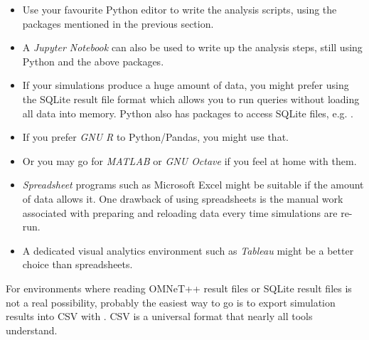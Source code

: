 \begin{itemize}
  \item Use your favourite Python editor to write the analysis scripts, using
    the packages mentioned in the previous section.
  \item A \textit{Jupyter Notebook} can also be used to write up the analysis
    steps, still using Python and the above packages.
  \item If your simulations produce a huge amount of data, you might prefer using
    the SQLite result file format which allows you to run queries without
    loading all data into memory. Python also has packages to access SQLite files,
    e.g. .
  \item If you prefer \textit{GNU R} to Python/Pandas, you might use that.
  \item Or you may go for \textit{MATLAB} or \textit{GNU Octave} if you feel at home with them.
  \item \textit{Spreadsheet} programs such as Microsoft Excel might be suitable
    if the amount of data allows it. One drawback of using spreadsheets is the
    manual work associated with preparing and reloading data every time
    simulations are re-run.
  \item A dedicated visual analytics environment such as \textit{Tableau} might
    be a better choice than spreadsheets.
\end{itemize}

For environments where reading OMNeT++ result files or SQLite result files is
not a real possibility, probably the easiest way to go is to export simulation
results into CSV with . CSV is a universal format that
nearly all tools understand.


